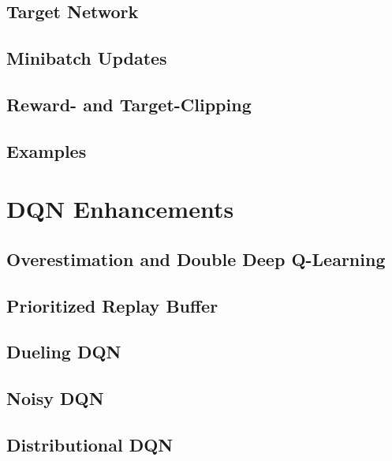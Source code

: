 		\subsection{Target Network} %

		\subsection{Minibatch Updates} %

		\subsection{Reward- and Target-Clipping} %

		\subsection{Examples} %

	\section{DQN Enhancements} %

		\subsection{Overestimation and Double Deep Q-Learning} %

		\subsection{Prioritized Replay Buffer} %

		\subsection{Dueling DQN} %

		\subsection{Noisy DQN} %

		\subsection{Distributional DQN} %

